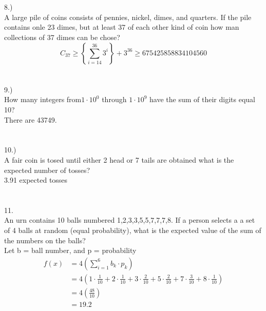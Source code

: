 \documentclass[fleqn]{article}
\begin{document}
\section*{}
8.)\\
A large pile of coins consists of pennies, nickel, dimes, and quarters. If the pile
contains onle 23 dimes, but at least 37 of each other kind of coin how man collections
of 37 dimes can be chose?
\begin{equation*}
  C_{37} \geq \left\{ \sum_{i=14}^{36}3^i \right\} + 3^{36} \geq 675425858834104560
\end{equation*}

\section*{}
9.)\\
How many integers from$ 1 \cdot 10^0$ through $ 1 \cdot 10^9$ have the sum of their digits
equal 10?\\
There are 43749.

\section*{}
10.)\\
A fair coin is tosed until either 2 head or 7 tails are obtained what is the expected 
number of tosses?
\\
3.91 expected tosses

\section*{}
11.\\
An urn contains 10 balls numbered 1,2,3,3,5,5,7,7,7,8. If a person selects a a set of
4 balls at random (equal probability), what is the expected value of the
sum of the numbers on the balls?\\
Let b = ball number, and p = probability \\

\begin{equation*}
  \begin{aligned}
    f\left(x  \right)&=  4 \left( \sum_{i=1}^{6}b_k \cdot p_k \right)\\ 
    &= 4\left(  1 \cdot \frac{1}{10}+2\cdot\frac{1}{10} + 3  
    \cdot \frac{2}{10} + 5 \cdot \frac{2}{10}+7\cdot\frac{3}{10}+8\cdot\frac{1}{10}\right)\\ 
    &= 4 \left( \frac{48}{10} \right)\\
    & =19.2
  \end{aligned}
\end{equation*}
\end{document}
